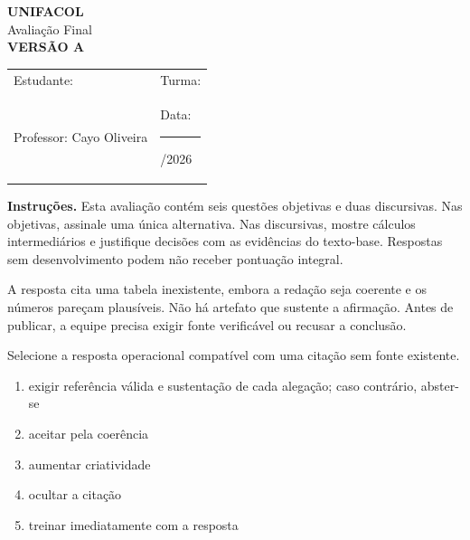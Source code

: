 \documentclass[12pt,a4paper]{article}
\begin{document}
\begin{center}
{\Large\bfseries UNIFACOL}\\[2mm]
{\large Avaliação Final}\\[1mm]
{\Large\bfseries VERSÃO A}
\end{center}
\begin{DocumentBox}[Identificação]
\begin{tabularx}{\textwidth}{@{}p{}p{}@{}}
Estudante: \hrulefill & Turma: \hrulefill\\[3mm]
Professor: Cayo Oliveira & Data: \rule{2.7cm}{.2pt}/2026
\end{tabularx}
\end{DocumentBox}
\textbf{Instruções.} Esta avaliação contém seis questões objetivas e duas discursivas. Nas objetivas, assinale uma única alternativa. Nas discursivas, mostre cálculos intermediários e justifique decisões com as evidências do texto-base. Respostas sem desenvolvimento podem não receber pontuação integral.
\bigskip

\TextoBase

A resposta cita uma tabela inexistente, embora a redação seja coerente e os números pareçam plausíveis. Não há artefato que sustente a afirmação. Antes de publicar, a equipe precisa exigir fonte verificável ou recusar a conclusão.

\FonteDidatica

\Comando Selecione a resposta operacional compatível com uma citação sem fonte existente.

\begin{enumerate}[label=\Alph*)]
  \item exigir referência válida e sustentação de cada alegação; caso contrário, abster-se
  \item aceitar pela coerência
  \item aumentar criatividade
  \item ocultar a citação
  \item treinar imediatamente com a resposta
\end{enumerate}
\end{document}
